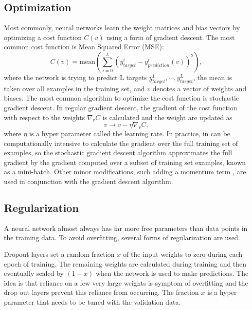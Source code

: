 \begin{refsection}
\subsection{Optimization}
Most commonly, neural networks learn the weight matrices and bias vectors by optimizing a cost function $C(v)$ using a form of gradient descent. The most common cost function is Mean Squared Error (MSE):
\begin{equation}
C(v)=\text{mean}\left(\sum_{i=0}^{L}\left(y_{target}^i-y_{prediction}^i(v)\right)^2\right),
\end{equation}
where the network is trying to predict L targets $y_{target}^1, \cdots, y_{target}^L$, the mean is taken over all examples in the training set, and $v$ denotes a vector of weights and biases. The most common algorithm to optimize the cost function is stochastic gradient descent. In regular gradient descent, the gradient of the cost function with respect to the weights $\nabla_v C$ is calculated and the weight are updated as
\begin{equation}
v\to v-\eta \nabla_v C,
\end{equation}
where $\eta$ is a hyper parameter called the learning rate. In practice, in can be computationally intensive to calculate the gradient over the full training set of examples, so the stochastic gradient descent algorithm approximates the full gradient by  the gradient computed over a subset of training set examples, known as a mini-batch. Other minor modifications, such adding a momentum term \cite{DBLP:journals/corr/abs-1206-5533} \cite{Hinton2012}, are used in conjunction with the gradient descent algorithm.

\subsection{Regularization}
A neural network almost always has far more free parameters than data points in the training data. To avoid overfitting, several forms of regularization are used. 

Dropout layers \cite{JMLR:v15:srivastava14a} set a random fraction $x$ of the input weights to zero during each epoch of training. The remaining weights are calculated during training and then eventually scaled by $(1-x)$ when the network is used to make predictions. The idea is that reliance on a few very large weights is symptom of overfitting and the drop out layers prevent this reliance from occurring. The fraction $x$ is a hyper parameter that needs to be tuned with the validation data.


\end{refsection}
